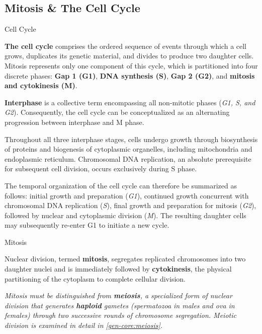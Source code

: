 \documentclass[10pt]{article}
\begin{document}
  \subsection{Mitosis \& The Cell Cycle}
   
    \begin{core}{Cell Cycle}

      \textbf{The cell cycle} comprises the ordered sequence of events through which a cell grows, duplicates its genetic material, and divides to produce two daughter cells. Mitosis represents only one component of this cycle, which is partitioned into four discrete phases: \textbf{Gap 1 (G1)}, \textbf{DNA synthesis (S)}, \textbf{Gap 2 (G2)}, and \textbf{mitosis and cytokinesis (M)}.

      \textbf{Interphase} is a collective term encompassing all non-mitotic phases (\textit{G1, S, and G2}). Consequently, the cell cycle can be conceptualized as an alternating progression between interphase and M phase.

      Throughout all three interphase stages, cells undergo growth through biosynthesis of proteins and biogenesis of cytoplasmic organelles, including mitochondria and endoplasmic reticulum. Chromosomal DNA replication, an absolute prerequisite for subsequent cell division, occurs exclusively during S phase.

      The temporal organization of the cell cycle can therefore be summarized as follows: initial growth and preparation (\textit{G1}), continued growth concurrent with chromosomal DNA replication (\textit{S}), final growth and preparation for mitosis (\textit{G2}), followed by nuclear and cytoplasmic division (\textit{M}). The resulting daughter cells may subsequently re-enter G1 to initiate a new cycle.


    \end{core}

    \begin{core}[label=core:mitosis]{Mitosis}

      Nuclear division, termed \textbf{mitosis}, segregates replicated chromosomes into two daughter nuclei and is immediately followed by \textbf{cytokinesis}, the physical partitioning of the cytoplasm to complete cellular division.

      \textit{Mitosis must be distinguished from \textbf{meiosis}, a specialized form of nuclear division that generates \textbf{haploid} gametes (spermatozoa in males and ova in females) through two successive rounds of chromosome segregation. Meiotic division is examined in detail in \autoref{gen-core:meiosis}.}

    \end{core}
    
\end{document}
